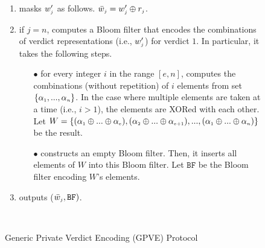 \begin{figure}[hbt!]
\begin{center}
\begin{boxedminipage}{12.4cm}
{\begin{enumerate}
\begin{equation*}
\begin{cases}
\end{cases}
\end{equation*}
%
\item masks  $w'_{\scriptscriptstyle j}$ as follows. %
%
$\bar w_{\scriptscriptstyle j}= w'_{\scriptscriptstyle j}\oplus r_{\scriptscriptstyle j}$.
%
\item if $j=n$, computes a Bloom filter that encodes the combinations of verdict representations (i.e., $w'_{\scriptscriptstyle j}$)  for verdict $1$. In particular, it takes the following steps. 
\begin{itemize}
%
\item[$\bullet$] for every integer $i$ in the range $[e,n]$, computes the combinations (without repetition) of $i$ elements from set $\{\alpha_{\scriptscriptstyle 1},..., \alpha_{\scriptscriptstyle n}\}$. In the case where  multiple elements are taken at a time (i.e., $i>1$), the elements are XORed with each other. Let $W=\{(\alpha_{\scriptscriptstyle 1}\oplus... \oplus \alpha_{\scriptscriptstyle e}), (\alpha_{\scriptscriptstyle 2}\oplus ... \oplus \alpha_{\scriptscriptstyle e+1}), ..., (\alpha_{\scriptscriptstyle 1}\oplus... \oplus \alpha_{\scriptscriptstyle n})\}$ be the result.  
%
\item[$\bullet$] constructs an empty Bloom filter. Then, it inserts all elements of $W$ into this Bloom filter. Let $\mathtt{BF}$ be the Bloom filter encoding $W$'s elements. 

\end{itemize}
%

%
\item outputs ($\bar{ w}_{\scriptscriptstyle j}, \mathtt{BF})$.





%
%
%
%




\
 \end{enumerate}
 
}
\end{boxedminipage}
\end{center}
\caption{Generic Private Verdict Encoding  (GPVE) Protocol} 
\label{fig:GPVE}
\end{figure}
